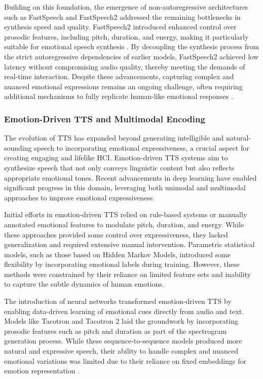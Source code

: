 Building on this foundation, the emergence of non-autoregressive architectures such as FastSpeech and FastSpeech2 addressed the remaining bottlenecks in synthesis speed and quality. FastSpeech2 introduced enhanced control over prosodic features, including pitch, duration, and energy, making it particularly suitable for emotional speech synthesis \cite{ren2020fastspeech}. By decoupling the synthesis process from the strict autoregressive dependencies of earlier models, FastSpeech2 achieved low latency without compromising audio quality, thereby meeting the demands of real-time interaction. Despite these advancements, capturing complex and nuanced emotional expressions remains an ongoing challenge, often requiring additional mechanisms to fully replicate human-like emotional responses \cite{liu2021fasttalker}.

\subsubsection{Emotion-Driven TTS and Multimodal Encoding}

The evolution of TTS has expanded beyond generating intelligible and natural-sounding speech to incorporating emotional expressiveness, a crucial aspect for creating engaging and lifelike HCI. Emotion-driven TTS systems aim to synthesize speech that not only conveys linguistic content but also reflects appropriate emotional tones. Recent advancements in deep learning have enabled significant progress in this domain, leveraging both unimodal and multimodal approaches to improve emotional expressiveness.

Initial efforts in emotion-driven TTS relied on rule-based systems or manually annotated emotional features to modulate pitch, duration, and energy. While these approaches provided some control over expressiveness, they lacked generalization and required extensive manual intervention. Parametric statistical models, such as those based on Hidden Markov Models, introduced some flexibility by incorporating emotional labels during training. However, these methods were constrained by their reliance on limited feature sets and inability to capture the subtle dynamics of human emotions\cite{tan2021survey}.

The introduction of neural networks transformed emotion-driven TTS by enabling data-driven learning of emotional cues directly from audio and text. Models like Tacotron and Tacotron 2 laid the groundwork by incorporating prosodic features such as pitch and duration as part of the spectrogram generation process. While these sequence-to-sequence models produced more natural and expressive speech, their ability to handle complex and nuanced emotional variations was limited due to their reliance on fixed embeddings for emotion representation .

